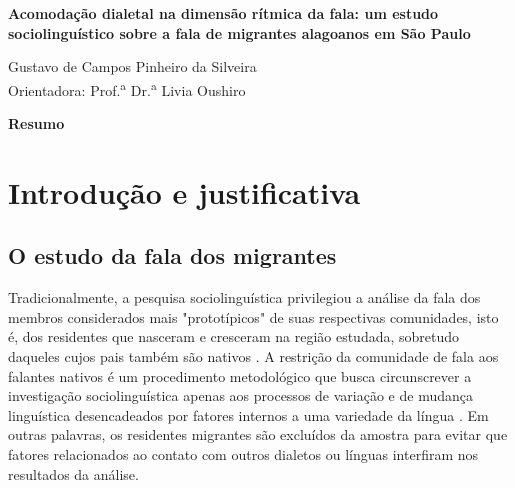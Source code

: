 \documentclass[
    a4paper,	%
    12pt,	%
    ]{article}	%
\begin{document}
	
{ %

	\begin{center}
		{\bfseries\Large\sffamily
		    Acomodação dialetal na dimensão rítmica da fala: um estudo sociolinguístico
		    sobre a fala de migrantes alagoanos em São Paulo
		}
	\end{center}
}
	
\vspace{0.35em}

{ %

	\begin{flushright} 
		Gustavo de Campos Pinheiro da Silveira \\ 
		\vspace{5pt}
		Orientadora: Prof.\textsuperscript{a} Dr.\textsuperscript{a} Livia Oushiro
	\end{flushright}

	\begin{center} 
	    {\bfseries\sffamily Resumo} \\ 
	\end{center}
	\par
	\vspace{0.35em}
		
}

\section{Introdução e justificativa} 
\label{intro}

	\subsection{O estudo da fala dos migrantes}

Tradicionalmente, a pesquisa sociolinguística privilegiou a análise da fala dos
membros considerados mais "prototípicos" de suas respectivas comunidades, isto
é, dos residentes que nasceram e cresceram na região estudada, sobretudo
daqueles cujos pais também são nativos \citep{Britain1992, Kerswill1993,
Milroy2002, Oushiro2016}. A restrição da comunidade de fala aos falantes nativos
é um procedimento metodológico que busca circunscrever a investigação
sociolinguística apenas aos processos de variação e de mudança linguística
desencadeados por fatores internos a uma variedade da língua \citep[][p.
20]{Milroy2002, Labov2001}. Em outras palavras, os residentes migrantes são
excluídos da amostra para evitar que fatores relacionados ao contato com outros
dialetos ou línguas interfiram nos resultados da análise.
\end{document}
